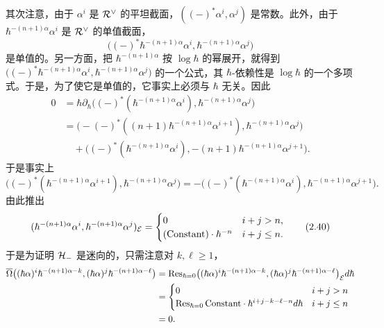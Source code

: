 其次注意，由于 $\alpha^{i}$ 是 $\mathcal{R}^\vee$ 的平坦截面，$((-)^{*}\alpha^{i},\alpha^{j})$ 是常数。此外，由于 $\hbar^{-(n+1)\alpha}\alpha^{i}$ 是 $\mathcal{R}^\vee$ 的单值截面，
\[
  \bigl((-)^{*}\hbar^{-(n+1)\alpha}\alpha^{i},\hbar^{-(n+1)\alpha}\alpha^{j}\bigr)
\]
是单值的。另一方面，把 $\hbar^{-(n+1)\alpha}$ 按 $\log\hbar$ 的幂展开，就得到
$\bigl((-)^{*}\hbar^{-(n+1)\alpha}\alpha^{i},\hbar^{-(n+1)\alpha}\alpha^{j}\bigr)$ 的一个公式，其
$\hbar$-依赖性是 $\log\hbar$ 的一个多项式。于是，为了使它是单值的，它事实上必须与 $\hbar$ 无关。因此
\begin{align*}
  0&=\hbar\partial_\hbar\bigl((-)^{*}(\hbar^{-(n+1)\alpha}\alpha^{i}),\hbar^{-(n+1)\alpha}\alpha^{j}\bigr)\\
  &=\bigl(-(-)^{*}((n+1)\hbar^{-(n+1)\alpha}\alpha^{i+1}),\hbar^{-(n+1)\alpha}\alpha^{j}\bigr)\\
  &\quad+\bigl((-)^{*}(\hbar^{-(n+1)\alpha}\alpha^{i}),-(n+1)\hbar^{-(n+1)\alpha}\alpha^{j+1}\bigr).
\end{align*}
于是事实上
\begin{equation}
  \bigl((-)^{*}(\hbar^{-(n+1)\alpha}\alpha^{i+1}),\hbar^{-(n+1)\alpha}\alpha^{j}\bigr)
  =-\bigl((-)^{*}(\hbar^{-(n+1)\alpha}\alpha^{i}),\hbar^{-(n+1)\alpha}\alpha^{j+1}\bigr). \tag{2.39}
\end{equation}
由此推出
\begin{equation}
  (\hbar^{-(n+1)\alpha}\alpha^{i},\hbar^{-(n+1)\alpha}\alpha^{j})_{\mathcal{E}}
  =\begin{cases}
    0 & i+j>n,\\
    (\text{Constant})\cdot\hbar^{-n} & i+j\le n.
  \end{cases} \tag{2.40}
\end{equation}
于是为证明 $\mathcal{H}_-$ 是迷向的，只需注意对 $k,\ell\ge1$，
\begin{align*}
  \overline{\Omega}\bigl((\hbar\alpha)^{i}\hbar^{-(n+1)\alpha-k},
  (\hbar\alpha)^{j}\hbar^{-(n+1)\alpha-\ell}\bigr)
  &=\operatorname{Res}_{\hbar=0}\bigl((\hbar\alpha)^{i}\hbar^{-(n+1)\alpha-k},
  (\hbar\alpha)^{j}\hbar^{-(n+1)\alpha-\ell}\bigr)_{\mathcal{E}} d\hbar\\
  &=\begin{cases}
    0 & i+j>n\\
    \operatorname{Res}_{\hbar=0}\text{Constant}\cdot\hbar^{i+j-k-\ell-n}d\hbar & i+j\le n
  \end{cases}\\
  &=0.
\end{align*}

